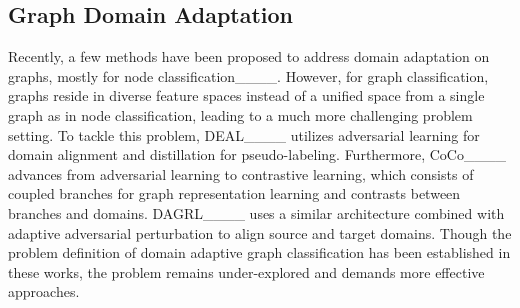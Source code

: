\subsection{Graph Domain Adaptation}
Recently, a few methods have been proposed to address domain adaptation on graphs, mostly for node classification____. However, for graph classification, graphs reside in diverse feature spaces instead of a unified space from a single graph as in node classification, leading to a much more challenging problem setting. To tackle this problem, DEAL____ utilizes adversarial learning for domain alignment and distillation for pseudo-labeling. Furthermore, CoCo____ advances from adversarial learning to contrastive learning, which consists of coupled branches for graph representation learning and contrasts between branches and domains. DAGRL____ uses a similar architecture combined with adaptive adversarial perturbation to align source and target domains. Though the problem definition of domain adaptive graph classification has been established in these works, the problem remains under-explored and demands more effective approaches.